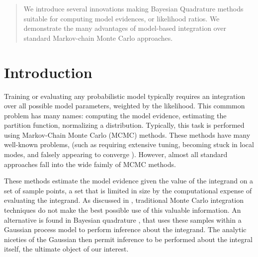 \documentclass{article}
\begin{document}
 

\begin{abstract} 
We introduce several innovations making Bayesian Quadrature methods suitable for computing model evidences, or likelihood ratios.  We demonstrate the many advantages of model-based integration over standard Markov-chain Monte Carlo approaches.
\end{abstract} 

\section{Introduction}

Training or evaluating any probabilistic model typically requires an integration over all possible model parameters, weighted by the likelihood.  This commmon problem has many names:  computing the model evidence, estimating the partition function, normalizing a distribution.  Typically, this task is performed using Markov-Chain Monte Carlo (MCMC) methods.  These methods have many well-known problems, (such as requiring extensive tuning, becoming stuck in local modes, and falsely appearing to converge \citep{NealMC}).  However, almost all standard approaches fall into the wide faimly of MCMC methods.

These methods estimate the model evidence given the value of the integrand on a set of sample points, a set that is limited in size by the computational expense of evaluating the integrand. As discussed in \citep{MCUnsound}, traditional Monte Carlo integration techniques do not make the best possible use of this valuable information. An alternative is found in Bayesian quadrature \citep{BZHermiteQuadrature}, that uses these samples within a Gaussian process model to perform inference about the integrand. The analytic niceties of the Gaussian then permit inference to be performed about the integral itself, the ultimate object of our interest.
\end{document}
